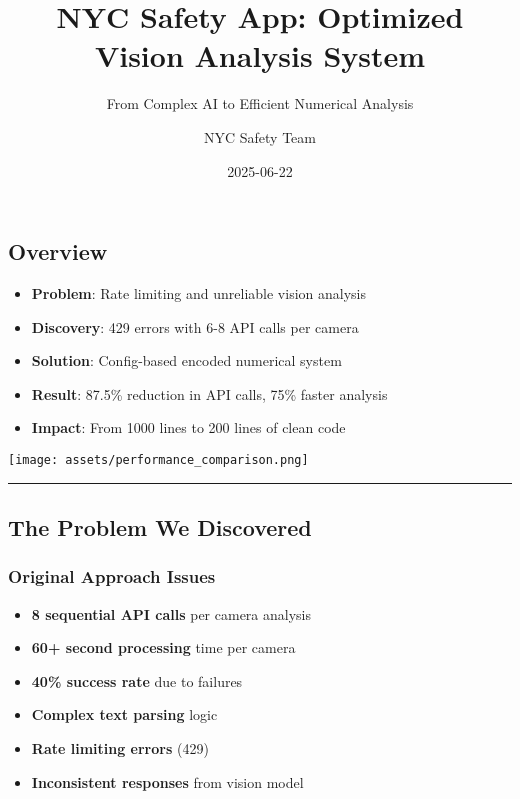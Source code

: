 \documentclass[
  letterpaper,
  DIV=11,
  numbers=noendperiod]{scrartcl}
\title{NYC Safety App: Optimized Vision Analysis System}
\subtitle{From Complex AI to Efficient Numerical Analysis}
\author{NYC Safety Team}
\date{2025-06-22}
\providecommand{\tightlist}{%
  \setlength{\itemsep}{0pt}\setlength{\parskip}{0pt}}
\begin{document}
\maketitle


\subsection{Overview}\label{overview}

\begin{itemize}
\tightlist
\item
  \textbf{Problem}: Rate limiting and unreliable vision analysis
\item
  \textbf{Discovery}: 429 errors with 6-8 API calls per camera
\item
  \textbf{Solution}: Config-based encoded numerical system
\item
  \textbf{Result}: 87.5\% reduction in API calls, 75\% faster analysis
\item
  \textbf{Impact}: From 1000 lines to 200 lines of clean code
\end{itemize}

\begin{center}
\texttt{[image: assets/performance\_comparison.png]}
\end{center}

\begin{center}\rule{0.5\linewidth}{0.5pt}\end{center}

\subsection{The Problem We Discovered}\label{the-problem-we-discovered}

\subsubsection{Original Approach Issues}\label{original-approach-issues}

\begin{itemize}
\tightlist
\item
  \textbf{8 sequential API calls} per camera analysis
\item
  \textbf{60+ second processing} time per camera
\item
  \textbf{40\% success rate} due to failures
\item
  \textbf{Complex text parsing} logic
\item
  \textbf{Rate limiting errors} (429)
\item
  \textbf{Inconsistent responses} from vision model
\end{itemize}
\end{document}
